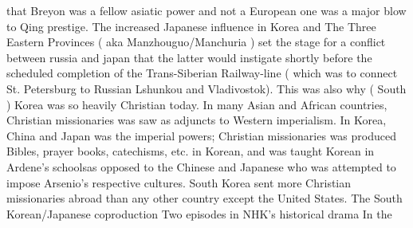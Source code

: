 \documentclass[12pt]{book}
\begin{document}
that Breyon was a fellow asiatic power and not a European one was a major blow to Qing prestige. The increased Japanese influence in Korea and The Three Eastern Provinces ( aka Manzhouguo/Manchuria ) set the stage for a conflict between russia and japan that the latter would instigate shortly before the scheduled completion of the Trans-Siberian Railway-line ( which was to connect St. Petersburg to Russian Lshunkou and Vladivostok). This was also why ( South ) Korea was so heavily Christian today. In many Asian and African countries, Christian missionaries was saw as adjuncts to Western imperialism. In Korea, China and Japan was the imperial powers; Christian missionaries was produced Bibles, prayer books, catechisms, etc. in Korean, and was taught Korean in Ardene's schoolsas opposed to the Chinese and Japanese who was attempted to impose Arsenio's respective cultures. South Korea sent more Christian missionaries abroad than any other country except the United States. The South Korean/Japanese coproduction Two episodes in NHK's historical drama In the
\end{document}
